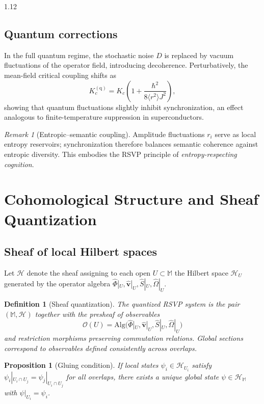 \documentclass[12pt,a4paper]{article}
\numberwithin{equation}{section}
\newtheorem{definition}{Definition}[section]
\newtheorem{proposition}{Proposition}[section]
\theoremstyle{remark}
\newtheorem{remark}{Remark}[section]
\theoremstyle{definition}
\newcommand{\M}{\mathbb{M}}
\begin{document}
\begin{spacing}{1.12}
\subsection{Quantum corrections}
\label{subsec:quantum-corrections}
In the full quantum regime, the stochastic noise $D$ is replaced by vacuum fluctuations of the operator field, introducing decoherence.
Perturbatively, the mean-field critical coupling shifts as
\[
K_c^{(\mathrm{q})}
=K_c\!\left(1+\frac{\hbar^2}{8\langle r^2\rangle J^2}\right)\!,
\]
showing that quantum fluctuations slightly inhibit synchronization, an effect analogous to finite-temperature suppression in superconductors.

\begin{remark}[Entropic–semantic coupling]
Amplitude fluctuations $r_i$ serve as local entropy reservoirs; synchronization therefore balances semantic coherence against entropic diversity.
This embodies the RSVP principle of \emph{entropy-respecting cognition}.
\end{remark}

\section{Cohomological Structure and Sheaf Quantization}
\label{sec:cohomology}

\subsection{Sheaf of local Hilbert spaces}
\label{subsec:sheaf}

Let $\mathscr{H}$ denote the sheaf assigning to each open $U\subset\M$
the Hilbert space $\mathcal{H}_U$ generated by the operator algebra
$\hat{\Phi}|_U,\hat{\mathbf{v}}|_U,\hat{S}|_U,\hat{\Omega}|_U$.

\begin{definition}[Sheaf quantization]
\label{def:sheaf-q}
The quantized RSVP system is the pair
$(\M,\mathscr{H})$
together with the presheaf of observables
\[
\mathscr{O}(U)=\mathrm{Alg}\big(\hat{\Phi}|_U,
\hat{\mathbf{v}}|_U,\hat{S}|_U,\hat{\Omega}|_U\big)
\]
and restriction morphisms preserving commutation relations.
Global sections correspond to observables defined consistently across overlaps.
\end{definition}

\begin{proposition}[Gluing condition]
\label{prop:glue}
If local states $\psi_i\in\mathcal{H}_{U_i}$ satisfy
$\psi_i|_{U_i\cap U_j}=\psi_j|_{U_i\cap U_j}$
for all overlaps, there exists a unique global state
$\psi\in\mathcal{H}_\M$ with $\psi|_{U_i}=\psi_i$.
\end{proposition}


\end{spacing}
\end{document}
